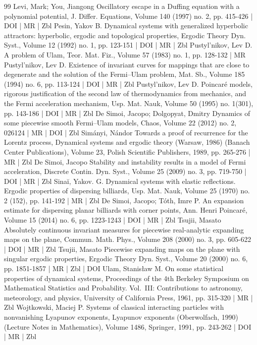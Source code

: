 \begin{thebibliography}{99}
Levi, Mark; You, Jiangong Oscillatory escape in a Duffing equation with a polynomial potential, J. Differ. Equations, Volume 140 (1997) no. 2, pp. 415-426 | DOI | MR | Zbl
Pesin, Yakov B. Dynamical systems with generalized hyperbolic attractors: hyperbolic, ergodic and topological properties, Ergodic Theory Dyn. Syst., Volume 12 (1992) no. 1, pp. 123-151 | DOI | MR | Zbl
Pustyl’nikov, Lev D. A problem of Ulam, Teor. Mat. Fiz., Volume 57 (1983) no. 1, pp. 128-132 | MR
Pustyl’nikov, Lev D. Existence of invariant curves for mappings that are close to degenerate and the solution of the Fermi–Ulam problem, Mat. Sb., Volume 185 (1994) no. 6, pp. 113-124 | DOI | MR | Zbl
Pustyl’nikov, Lev D. Poincaré models, rigorous justification of the second law of thermodynamics from mechanics, and the Fermi acceleration mechanism, Usp. Mat. Nauk, Volume 50 (1995) no. 1(301), pp. 143-186 | DOI | MR | Zbl
De Simoi, Jacopo; Dolgopyat, Dmitry Dynamics of some piecewise smooth Fermi–Ulam models, Chaos, Volume 22 (2012) no. 2, 026124 | MR | DOI | Zbl
Simányi, Nándor Towards a proof of recurrence for the Lorentz process, Dynamical systems and ergodic theory (Warsaw, 1986) (Banach Center Publications), Volume 23, Polish Scientific Publishers, 1989, pp. 265-276 | MR | Zbl
De Simoi, Jacopo Stability and instability results in a model of Fermi acceleration, Discrete Contin. Dyn. Syst., Volume 25 (2009) no. 3, pp. 719-750 | DOI | MR | Zbl
Sinaĭ, Yakov. G. Dynamical systems with elastic reflections. Ergodic properties of dispersing billiards, Usp. Mat. Nauk, Volume 25 (1970) no. 2 (152), pp. 141-192 | MR | Zbl
De Simoi, Jacopo; Tóth, Imre P. An expansion estimate for dispersing planar billiards with corner points, Ann. Henri Poincaré, Volume 15 (2014) no. 6, pp. 1223-1243 | DOI | MR | Zbl
Tsujii, Masato Absolutely continuous invariant measures for piecewise real-analytic expanding maps on the plane, Commun. Math. Phys., Volume 208 (2000) no. 3, pp. 605-622 | DOI | MR | Zbl
Tsujii, Masato Piecewise expanding maps on the plane with singular ergodic properties, Ergodic Theory Dyn. Syst., Volume 20 (2000) no. 6, pp. 1851-1857 | MR | Zbl | DOI
Ulam, Stanisław M. On some statistical properties of dynamical systems, Proceedings of the 4th Berkeley Symposium on Mathematical Statistics and Probability. Vol. III: Contributions to astronomy, meteorology, and physics, University of California Press, 1961, pp. 315-320 | MR | Zbl
Wojtkowski, Maciej P. Systems of classical interacting particles with nonvanishing Lyapunov exponents, Lyapunov exponents (Oberwolfach, 1990) (Lecture Notes in Mathematics), Volume 1486, Springer, 1991, pp. 243-262 | DOI | MR | Zbl

\end{thebibliography}
